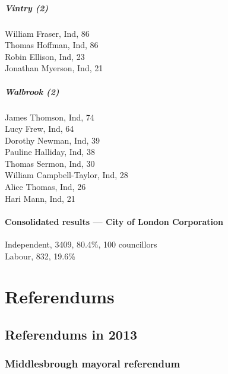 \documentclass[a4paper,openany,10pt]{book}
\begin{document}
\subsubsection*{Vintry (2)}



William Fraser, Ind, 86\\
Thomas Hoffman, Ind, 86\\
Robin Ellison, Ind, 23\\
Jonathan Myerson, Ind, 21\\


\subsubsection*{Walbrook (2)}



James Thomson, Ind, 74\\
Lucy Frew, Ind, 64\\
Dorothy Newman, Ind, 39\\
Pauline Halliday, Ind, 38\\
Thomas Sermon, Ind, 30\\
William Campbell-Taylor, Ind, 28\\
Alice Thomas, Ind, 26\\
Hari Mann, Ind, 21\\




\subsection*{Consolidated results --- City of London Corporation}
Independent, 3409, 80.4\%, 100 councillors\\
Labour, 832, 19.6\% \\


\part{Referendums}

\chapter{Referendums in 2013}

\section{Middlesbrough mayoral referendum}
\end{document}
